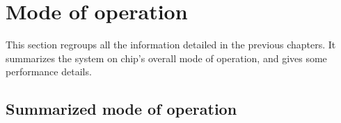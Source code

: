 
\section{Mode of operation}

This section regroups all the information detailed in the previous chapters. It summarizes the system on chip's overall mode of operation, and gives some performance details.

\subsection{Summarized mode of operation}

